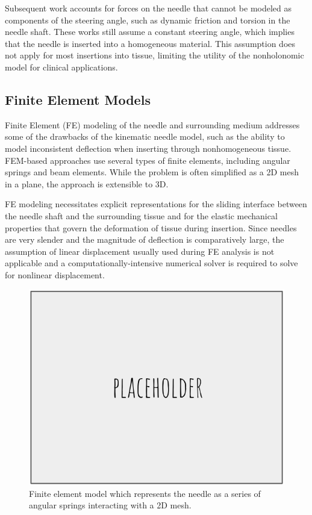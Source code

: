 Subsequent work accounts for forces on the needle that cannot be modeled as components of the steering angle, such as dynamic friction and torsion in the needle shaft\cite{reed_modeling_2009, swensen_torsional_2014}. These works still assume a constant steering angle, which implies that the needle is inserted into a homogeneous material. This assumption does not apply for most insertions into tissue, limiting the utility of the nonholonomic model for clinical applications.

\subsection{Finite Element Models}
Finite Element (FE) modeling of the needle and surrounding medium addresses some of the drawbacks of the kinematic needle model, such as the ability to model inconsistent deflection when inserting through nonhomogeneous tissue\cite{goksel_modeling_2009}. FEM-based approaches use several types of finite elements, including angular springs and beam elements. While the problem is often simplified as a 2D mesh in a plane, the approach is extensible to 3D\cite{chentanez_interactive_2009}.

FE modeling necessitates explicit representations for the sliding interface between the needle shaft and the surrounding tissue and for the elastic mechanical properties that govern the deformation of tissue during insertion\cite{dehghan_comparison_2006}. Since needles are very slender and the magnitude of deflection is comparatively large, the assumption of linear displacement usually used during FE analysis is not applicable and a computationally-intensive numerical solver is required to solve for nonlinear displacement.



\begin{figure}[h]
\includegraphics[width=1.0\textwidth]{Fig/placeholder.png}
\caption{Finite element model which represents the needle as a series of angular springs interacting with a 2D mesh\cite{goksel_modeling_2009}.}
\label{fig:needle_fe_model}
\end{figure}

